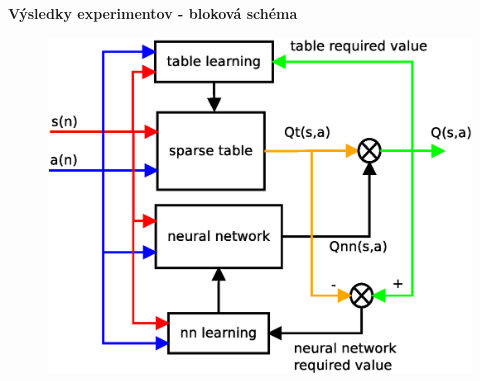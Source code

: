 \documentclass[xcolor=dvipsnames]{beamer}
\begin{document}
\begin{frame}{\bf Výsledky experimentov - bloková schéma}

\begin{figure}[!htb]
\centering
\includegraphics[scale=.4]{../diagrams/q_learning_hybrid.eps}
\end{figure}

\end{frame}
\end{document}
